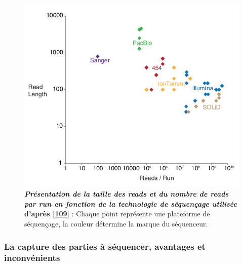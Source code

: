 \documentclass[12pt,a4paper,twoside]{ugathesis}
\theoremstyle{definition}
\theoremstyle{definition}
\theoremstyle{definition}
\theoremstyle{remark}
\begin{document}
\begin{figure}

{\centering \includegraphics[scale=.55]{figure/read_per_run} 

}

\caption[Présentation de la taille des reads et du nombre de reads par run en fonction de la technologie de séquençage utilisée]{\textbf{\emph{Présentation de la taille des reads
et du nombre de reads par run en fonction de la technologie de
séquençage utilisée} d'après
{[}\protect\hyperlink{ref-Hodkinson2015}{109}{]}} : Chaque point
représente une plateforme de séquençage, la couleur détermine la marque
du séquenceur.}\label{fig:pictreadPerRun}
\end{figure}








\subsubsection{La capture des parties à séquencer, avantages et
inconvénients}\label{la-capture-des-parties-a-sequencer-avantages-et-inconvenients}
\end{document}
